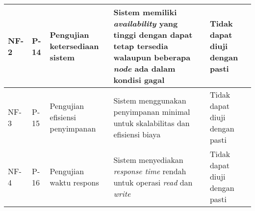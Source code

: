 \begin{longtable}{|l|l|p{3cm}|p{3cm}|l|}
NF-2 & P-14 & Pengujian ketersediaan sistem & Sistem memiliki \textit{availability} yang tinggi dengan dapat tetap tersedia walaupun beberapa \textit{node} ada dalam kondisi gagal & Tidak dapat diuji dengan pasti \\ \hline
NF-3 & P-15 & Pengujian efisiensi penyimpanan & Sistem menggunakan penyimpanan minimal untuk skalabilitas dan efisiensi biaya & Tidak dapat diuji dengan pasti \\ \hline
NF-4 & P-16 & Pengujian waktu respons & Sistem menyediakan \textit{response time} rendah untuk operasi \textit{read} dan \textit{write} & Tidak dapat diuji dengan pasti \\ \hline
\end{longtable}